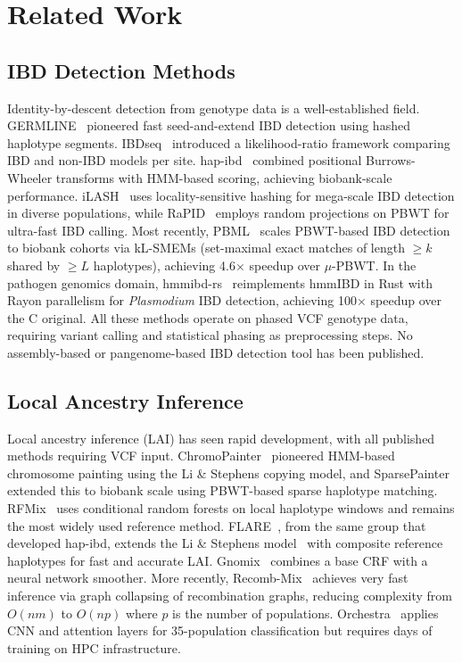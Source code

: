 \section{Related Work}
\label{sec:related_work}

\subsection{IBD Detection Methods}

Identity-by-descent detection from genotype data is a well-established field. GERMLINE~\cite{gusev2009germline} pioneered fast seed-and-extend IBD detection using hashed haplotype segments. IBDseq~\cite{browning2013ibdseq} introduced a likelihood-ratio framework comparing IBD and non-IBD models per site. hap-ibd~\cite{browning2020hap_ibd} combined positional Burrows-Wheeler transforms with HMM-based scoring, achieving biobank-scale performance. iLASH~\cite{shemirani2021ilash} uses locality-sensitive hashing for mega-scale IBD detection in diverse populations, while RaPID~\cite{naseri2019rapid} employs random projections on PBWT for ultra-fast IBD calling. Most recently, PBML~\cite{pbml2026} scales PBWT-based IBD detection to biobank cohorts via kL-SMEMs (set-maximal exact matches of length $\geq k$ shared by $\geq L$ haplotypes), achieving 4.6$\times$ speedup over $\mu$-PBWT. In the pathogen genomics domain, hmmibd-rs~\cite{hmmibdrs2026} reimplements hmmIBD in Rust with Rayon parallelism for \textit{Plasmodium} IBD detection, achieving 100$\times$ speedup over the C original. All these methods operate on phased VCF genotype data, requiring variant calling and statistical phasing as preprocessing steps. No assembly-based or pangenome-based IBD detection tool has been published.

\subsection{Local Ancestry Inference}

Local ancestry inference (LAI) has seen rapid development, with all published methods requiring VCF input. ChromoPainter~\cite{lawson2012chromopainter} pioneered HMM-based chromosome painting using the Li \& Stephens copying model, and SparsePainter~\cite{wang2024sparsepainter} extended this to biobank scale using PBWT-based sparse haplotype matching. RFMix~\cite{maples2013rfmix} uses conditional random forests on local haplotype windows and remains the most widely used reference method. FLARE~\cite{browning2023flare}, from the same group that developed hap-ibd, extends the Li \& Stephens model~\cite{li2003stephens} with composite reference haplotypes for fast and accurate LAI. Gnomix~\cite{hilmarsson2021gnomix} combines a base CRF with a neural network smoother. More recently, Recomb-Mix~\cite{zhou2025recombmix} achieves very fast inference via graph collapsing of recombination graphs, reducing complexity from $O(nm)$ to $O(np)$ where $p$ is the number of populations. Orchestra~\cite{hou2025orchestra} applies CNN and attention layers for 35-population classification but requires days of training on HPC infrastructure.

